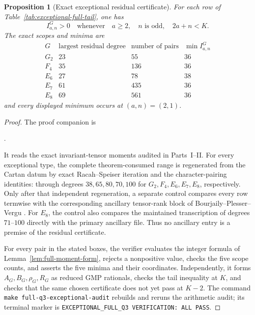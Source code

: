 \documentclass[11pt,reqno]{amsart}
\theoremstyle{plain}
\newtheorem{proposition}[theorem]{Proposition}
\theoremstyle{definition}
\begin{document}
\begin{proposition}[Exact exceptional residual certificate]
\label{prop:exceptional-full-residual}
For each row of Table~\ref{tab:exceptional-full-tail}, one has
\[
 I^G_{a,n}>0
 \quad\text{whenever}\quad
 a\geq2,\quad n\text{ is odd},\quad 2a+n<K.
\]
The exact scopes and minima are
\[
\begin{array}{c|rrr}
G&\text{largest residual degree}&\text{number of pairs}&
 \min I^G_{a,n}\\ \hline
G_2&23&55&36\\
F_4&35&136&36\\
E_6&27&78&38\\
E_7&61&435&36\\
E_8&69&561&36
\end{array}
\]
and every displayed minimum occurs at $(a,n)=(2,1)$.
\end{proposition}

\begin{proof}
The proof companion is
\begin{center}
.
\end{center}
It reads the exact invariant-tensor moments audited in Parts~I--II.  For every
exceptional type, the complete theorem-consumed range is regenerated from the
Cartan datum by exact Racah--Speiser iteration and the character-pairing
identities: through degrees $38,65,80,70,100$ for
$G_2,F_4,E_6,E_7,E_8$, respectively.  Only after that independent
regeneration, a separate control compares every row termwise with the
corresponding ancillary tensor-rank block of Bourjaily--Plesser--Vergu
\cite[ancillary file \texttt{adjoint\_tensor\_ranks.tex}]{BPV2024}.
For $E_8$, the control also compares the maintained transcription of degrees
$71$--$100$ directly with the primary ancillary file.  Thus no ancillary
entry is a premise of the residual certificate.

For every pair in the stated boxes, the verifier evaluates the integer
formula of Lemma~\ref{lem:full-moment-form}, rejects a nonpositive value,
checks the five scope counts, and asserts the five minima and their
coordinates.  Independently, it forms $A_G,B_G,\rho_G,R_G$ as reduced GMP
rationals, checks the tail inequality at $K$, and checks that the same chosen
certificate does not yet pass at $K-2$.  The command
\texttt{make full-q3-exceptional-audit} rebuilds and reruns the arithmetic
audit; its terminal marker is
\texttt{EXCEPTIONAL\_FULL\_Q3 VERIFICATION: ALL PASS}.
\end{proof}
\end{document}
